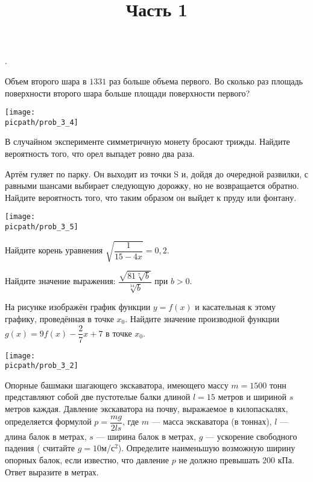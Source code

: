 \begin{training}[2]
	\title{Часть 1}
	\egepreambone
	\begin{listofex}
		\item
		.
		\foranswer
		\item
		\begin{minipage}[t]{\bodywidth}
			Объем второго шара в \( 1331 \) раз больше объема первого. Во сколько раз площадь поверхности второго шара больше площади поверхности первого?
			\foranswer
		\end{minipage}
		\gapwidth
		\begin{minipage}[t]{\picwidth}
			\texttt{[image: \\picpath/prob\_3\_4]}
		\end{minipage}
		\item В случайном эксперименте симметричную монету бросают трижды. Найдите вероятность того, что орел выпадет ровно два раза.
		\foranswer
		\item 
		\begin{minipage}[t]{\bodywidth} 
			Артём гуляет по парку. Он выходит из точки S и, дойдя до очередной развилки, с равными шансами выбирает следующую дорожку, но не возвращается обратно. Найдите вероятность того, что таким образом он выйдет к пруду или фонтану.
			\foranswer
		\end{minipage}
		\gapwidth
		\begin{minipage}[t]{\picwidth}
			\texttt{[image: \\picpath/prob\_3\_5]}
		\end{minipage}
		\item Найдите корень уравнения \( \sqrt{\dfrac{1}{15-4x}}=0,2 \). 
		\foranswer
		\newpage
		\hphantom{Часть 1}
		\item Найдите значение выражения: \( \dfrac{\sqrt{81\sqrt[7]{b}}}{\sqrt[14]{b}} \) при \( b>0 \).
		\foranswer
		\item
		На рисунке изображён график функции \( y=f(x) \) и касательная к этому графику, проведённая в точке \( x_0 \). Найдите значение производной функции \( g(x)=9f(x)-\dfrac{2}{7}x+7 \) в точке \( x_0 \).
		\begin{center}
			\texttt{[image: \\picpath/prob\_3\_2]}
		\end{center}
		\foranswer
		\item Опорные башмаки шагающего экскаватора, имеющего массу \( m=1500 \) тонн представляют собой две пустотелые балки длиной \( l=15 \) метров и шириной \( s \) метров каждая. Давление экскаватора на почву, выражаемое в килопаскалях, определяется формулой \( p=\dfrac{mg}{2ls} \), где \( m \) --- масса экскаватора (в тоннах), \( l \) ---длина балок в метрах, \( s \) --- ширина балок в метрах, \( g \) --- ускорение свободного падения ( считайте \( g=10 \)м/с\( ^2 \)). Определите наименьшую возможную ширину опорных балок, если известно, что давление \( p \) не должно превышать \( 200 \) кПа. Ответ выразите в метрах.

\end{listofex}
\end{training}
